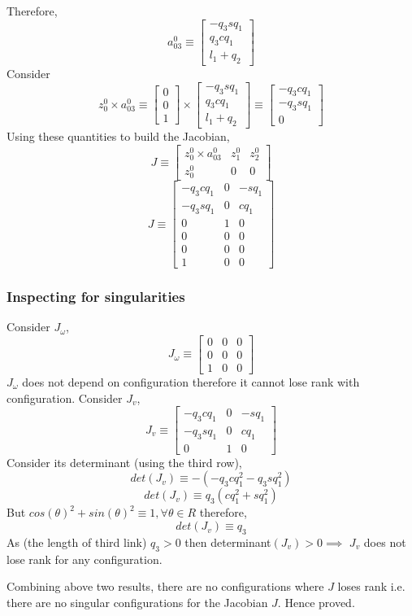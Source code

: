\documentclass[12pt]{article}
\begin{document}
Therefore,
\[
  a_{03}^0 \equiv
  \begin{bmatrix}
    -q_3sq_1 \\
    q_3cq_1 \\
    l_1 + q_2
  \end{bmatrix}
\]
Consider
\[
  z_0^0 \times a_{03}^0 \equiv
  \begin{bmatrix}
    0 \\
    0 \\
    1
  \end{bmatrix}
  \times
  \begin{bmatrix}
    -q_3sq_1 \\
    q_3cq_1 \\
    l_1 + q_2
  \end{bmatrix}
  \equiv
  \begin{bmatrix}
    -q_3cq_1 \\
    -q_3sq_1 \\
    0
  \end{bmatrix}
\]
Using these quantities to build the Jacobian,
\[
  J \equiv
  \begin{bmatrix}
    z_0^0 \times a_{03}^0 & z_1^0 & z_2^0 \\
    z_0^0 & 0 & 0
  \end{bmatrix}
\]
\[
  J \equiv
  \begin{bmatrix}
    -q_3cq_1 & 0 & -sq_1 \\
    -q_3sq_1 & 0 &  cq_1 \\
    0        & 1 &  0 \\
    0 & 0 & 0 \\
    0 & 0 & 0 \\
    1 & 0 & 0
  \end{bmatrix}
\]

\subsubsection*{Inspecting for singularities}
Consider $J_\omega$,
\[
  J_\omega \equiv
  \begin{bmatrix}
    0 & 0 & 0 \\
    0 & 0 & 0 \\
    1 & 0 & 0
  \end{bmatrix}
\]
$J_\omega$ does not depend on configuration therefore it cannot lose rank with configuration.
Consider $J_v$,
\[
  J_v \equiv
  \begin{bmatrix}
    -q_3cq_1 & 0 & -sq_1 \\
    -q_3sq_1 & 0 &  cq_1 \\
    0        & 1 &  0
  \end{bmatrix}
\]
Consider its determinant (using the third row),
\[
  det(J_v) \equiv
  -(-q_3cq_1^2 - q_3sq_1^2)
\]
\[
  det(J_v) \equiv
  q_3(cq_1^2 + sq_1^2)
\]
But $cos(\theta)^2 + sin(\theta)^2 \equiv 1, \forall \theta \in R$ therefore,
\[
  det(J_v) \equiv q_3
\]
As (the length of third link) $q_3 > 0$ then determinant$(J_v) > 0 \implies$ $J_v$ does not lose rank for any configuration.

Combining above two results, there are no configurations where $J$ loses rank i.e. there are no singular configurations for the Jacobian $J$.
Hence proved.
\end{document}
